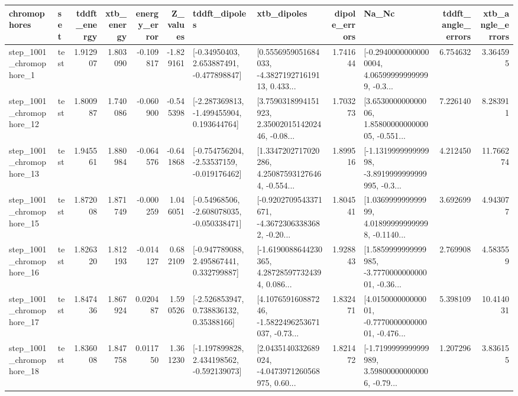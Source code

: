 \begin{tabular}{llrrrrllrlrr}
\toprule
             chromophores &       set &  tddft\_energy &  xtb\_energy &  energy\_error &  Z\_values &                               tddft\_dipoles &                                        xtb\_dipoles &  dipole\_errors &                                              Na\_Nc &  tddft\_angle\_errors &  xtb\_angle\_errors \\
\midrule
  step\_1001\_chromophore\_1 &      test &      1.912907 &    1.803090 &     -0.109817 & -1.829161 &    [-0.34950403, 2.653887491, -0.477898847] &  [0.5556959051684033, -4.382719271619113, 0.433... &       1.741644 &  [-0.29400000000000004, 4.065999999999999, -0.3... &            6.754632 &          3.364595 \\
 step\_1001\_chromophore\_12 &      test &      1.800987 &    1.740086 &     -0.060900 & -0.545398 &   [-2.287369813, -1.499455904, 0.193644764] &  [3.7590318994151923, 2.3500201514202446, -0.08... &       1.703273 &  [3.653000000000006, 1.8580000000000005, -0.551... &            7.226140 &          8.283911 \\
 step\_1001\_chromophore\_13 &      test &      1.945561 &    1.880984 &     -0.064576 & -0.641868 &   [-0.754756204, -2.53537159, -0.019176462] &  [1.3347202717020286, 4.250875931276464, -0.554... &       1.899516 &  [-1.131999999999998, -3.8919999999999995, -0.3... &            4.212450 &         11.766274 \\
 step\_1001\_chromophore\_15 &      test &      1.872008 &    1.871749 &     -0.000259 &  1.046051 &   [-0.54968506, -2.608078035, -0.050338471] &  [-0.9202709543371671, -4.36723063383682, -0.20... &       1.804541 &  [1.036999999999999, 4.018999999999998, -0.1140... &            3.692699 &          4.943077 \\
 step\_1001\_chromophore\_16 &      test &      1.826320 &    1.812193 &     -0.014127 &  0.682109 &    [-0.947789088, 2.495867441, 0.332799887] &  [-1.6190088644230365, 4.287285977324394, 0.086... &       1.928843 &  [1.5859999999999985, -3.777000000000001, -0.36... &            2.769908 &          4.583559 \\
 step\_1001\_chromophore\_17 &      test &      1.847436 &    1.867924 &      0.020487 &  1.590526 &     [-2.526853947, 0.738836132, 0.35388166] &  [4.107659160887246, -1.5822496253671037, -0.73... &       1.832471 &  [4.015000000000001, -0.777000000000001, -0.476... &            5.398109 &         10.414031 \\
 step\_1001\_chromophore\_18 &      test &      1.836008 &    1.847758 &      0.011750 &  1.361230 &   [-1.197899828, 2.434198562, -0.592139073] &  [2.0435140332689024, -4.0473971260568975, 0.60... &       1.821472 &  [-1.7199999999999989, 3.598000000000006, -0.79... &            1.207296 &          3.836155 \\

\end{tabular}
